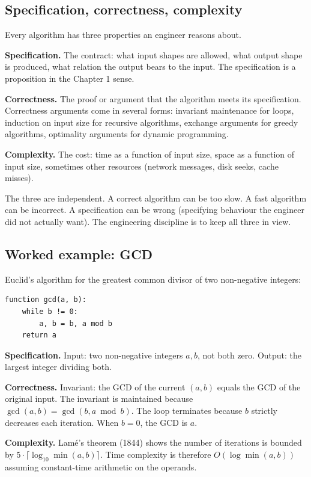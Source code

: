 \subsection{Specification, correctness, complexity}

Every algorithm has three properties an engineer reasons about.

\textbf{Specification.} The contract: what input shapes are allowed, what output shape is produced, what relation the output bears to the input. The specification is a proposition in the Chapter 1 sense.

\textbf{Correctness.} The proof or argument that the algorithm meets its specification. Correctness arguments come in several forms: invariant maintenance for loops, induction on input size for recursive algorithms, exchange arguments for greedy algorithms, optimality arguments for dynamic programming.

\textbf{Complexity.} The cost: time as a function of input size, space as a function of input size, sometimes other resources (network messages, disk seeks, cache misses).

The three are independent. A correct algorithm can be too slow. A fast algorithm can be incorrect. A specification can be wrong (specifying behaviour the engineer did not actually want). The engineering discipline is to keep all three in view.

\subsection{Worked example: GCD}

Euclid's algorithm for the greatest common divisor of two non-negative integers:

\begin{verbatim}
function gcd(a, b):
    while b != 0:
        a, b = b, a mod b
    return a
\end{verbatim}

\textbf{Specification.} Input: two non-negative integers $a, b$, not both zero. Output: the largest integer dividing both.

\textbf{Correctness.} Invariant: the GCD of the current $(a, b)$ equals the GCD of the original input. The invariant is maintained because $\gcd(a, b) = \gcd(b, a \bmod b)$. The loop terminates because $b$ strictly decreases each iteration. When $b = 0$, the GCD is $a$.

\textbf{Complexity.} Lamé's theorem (1844) shows the number of iterations is bounded by $5 \cdot \lceil \log_{10} \min(a, b) \rceil$. Time complexity is therefore $O(\log \min(a, b))$ assuming constant-time arithmetic on the operands.

